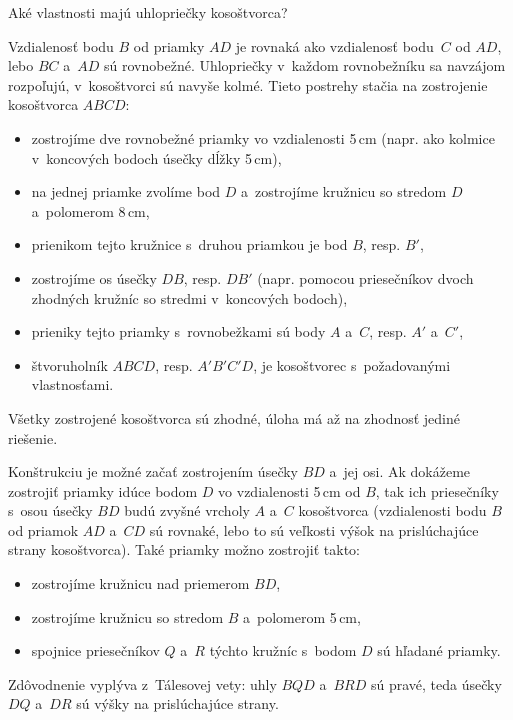 {%
\napad
Aké vlastnosti majú uhlopriečky kosoštvorca?

\riesenie
Vzdialenosť bodu $B$ od priamky $AD$ je rovnaká ako vzdialenosť bodu~$C$ od $AD$, lebo $BC$ a~$AD$ sú rovnobežné.
Uhlopriečky v~každom rovnobežníku sa navzájom rozpoľujú, v~kosoštvorci sú navyše kolmé.
Tieto postrehy stačia na zostrojenie kosoštvorca $ABCD$:
\begin{itemize}
\item zostrojíme dve rovnobežné priamky vo vzdialenosti 5\,cm (napr. ako kolmice v~koncových bodoch úsečky dĺžky 5\,cm),
\item na jednej priamke zvolíme bod $D$ a~zostrojíme kružnicu so stredom $D$ a~polomerom 8\,cm,
\item prienikom tejto kružnice s~druhou priamkou je bod $B$, resp. $B'$,
\item zostrojíme os úsečky $DB$, resp. $DB'$ (napr. pomocou priesečníkov dvoch zhodných kružníc so stredmi v~koncových bodoch),
\item prieniky tejto priamky s~rovnobežkami sú body $A$ a~$C$, resp. $A'$ a~$C'$,
\item štvoruholník $ABCD$, resp. $A'B'C'D$, je kosoštvorec s~požadovanými vlastnosťami.%
\end{itemize}



Všetky zostrojené kosoštvorca sú zhodné, úloha má až na zhodnosť jediné riešenie.

\poznamka
Konštrukciu je možné začať zostrojením úsečky $BD$ a~jej osi.
Ak dokážeme zostrojiť priamky idúce bodom $D$ vo vzdialenosti 5\,cm od $B$, tak ich priesečníky s~osou úsečky $BD$ budú zvyšné vrcholy $A$ a~$C$ kosoštvorca
(vzdialenosti bodu $B$ od priamok $AD$ a~$CD$ sú rovnaké, lebo to sú veľkosti výšok na prislúchajúce strany kosoštvorca).
Také priamky možno zostrojiť takto:
\begin{itemize}
\item zostrojíme kružnicu nad priemerom $BD$,
\item zostrojíme kružnicu so stredom $B$ a~polomerom 5\,cm,
\item spojnice priesečníkov $Q$ a~$R$ týchto kružníc s~bodom $D$ sú hľadané priamky.
\end{itemize}
Zdôvodnenie vyplýva z~Tálesovej vety: uhly $BQD$ a~$BRD$ sú pravé, teda úsečky $DQ$ a~$DR$ sú výšky na prislúchajúce strany.
%


}

